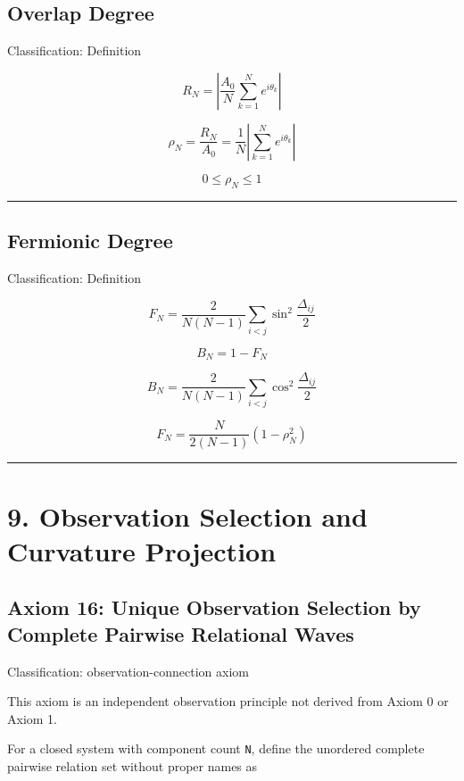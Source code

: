 \documentclass[
  a4paper,
]{article}
\begin{document}
\subsection{Overlap Degree}\label{overlap-degree}

Classification: Definition

\[
R_N=\left|\frac{A_0}{N}\sum_{k=1}^{N}e^{i\theta_k}\right|
\]

\[
\rho_N=\frac{R_N}{A_0}
=\frac{1}{N}\left|\sum_{k=1}^{N}e^{i\theta_k}\right|
\]

\[
0\le\rho_N\le1
\]

\begin{center}\rule{0.5\linewidth}{0.5pt}\end{center}

\subsection{Fermionic Degree}\label{fermionic-degree}

Classification: Definition

\[
F_N=
\frac{2}{N(N-1)}
\sum_{i<j}\sin^2\frac{\Delta_{ij}}{2}
\]

\[
B_N=1-F_N
\]

\[
B_N=
\frac{2}{N(N-1)}
\sum_{i<j}\cos^2\frac{\Delta_{ij}}{2}
\]

\[
F_N=\frac{N}{2(N-1)}(1-\rho_N^2)
\]

\begin{center}\rule{0.5\linewidth}{0.5pt}\end{center}

\section{9. Observation Selection and Curvature
Projection}\label{observation-selection-and-curvature-projection}

\subsection{Axiom 16: Unique Observation Selection by Complete Pairwise
Relational
Waves}\label{axiom-16-unique-observation-selection-by-complete-pairwise-relational-waves}

Classification: observation-connection axiom

This axiom is an independent observation principle not derived from
Axiom 0 or Axiom 1.

For a closed system with component count \texttt{N}, define the
unordered complete pairwise relation set without proper names as
\end{document}
